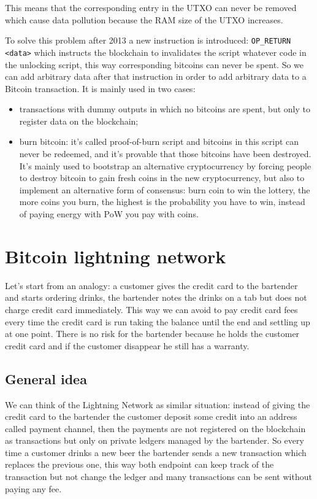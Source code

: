 This means that the corresponding entry in the UTXO can never be removed which cause data pollution because the RAM size of the UTXO increases.

To solve this problem after 2013 a new instruction is introduced: \verb|OP_RETURN <data>| which instructs the blockchain to invalidates the script whatever code in the unlocking script, this way corresponding bitcoins can never be spent.
So we can add arbitrary data after that instruction in order to add arbitrary data to a Bitcoin transaction.
It is mainly used in two cases:
\begin{itemize}
    \item transactions with dummy outputs in which no bitcoins are spent, but only to register data on the blockchain;
    \item burn bitcoin: it's called proof-of-burn script and bitcoins in this script can never be redeemed, and it's provable that those bitcoins have been destroyed.
    It's mainly used to bootstrap an alternative cryptocurrency by forcing people to destroy bitcoin to gain fresh coins in the new cryptocurrency, but also to implement an alternative form of consensus: burn coin to win the lottery, the more coins you burn, the highest is the probability you have to win, instead of paying energy with PoW you pay with coins.
\end{itemize}

\section{Bitcoin lightning network}
Let's start from an analogy: a customer gives the credit card to the bartender and starts ordering drinks, the bartender notes the drinks on a tab but does not charge credit card immediately.
This way we can avoid to pay credit card fees every time the credit card is run taking the balance until the end and settling up at one point.
There is no risk for the bartender because he holds the customer credit card and if the customer disappear he still has a warranty.

\subsection{General idea}
We can think of the Lightning Network as similar situation: instead of giving the credit card to the bartender the customer deposit some credit into an address called payment channel, then the payments are not registered on the blockchain as transactions but only on private ledgers managed by the bartender.
So every time a customer drinks a new beer the bartender sends a new transaction which replaces the previous one, this way both endpoint can keep track of the transaction but not change the ledger and many transactions can be sent without paying any fee.

